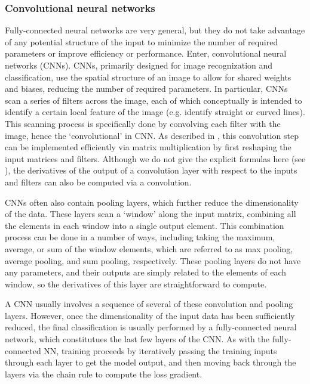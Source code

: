\subsubsection{Convolutional neural networks}
Fully-connected neural networks are very general, but they do not take advantage of any potential structure of the input to minimize the number of required parameters or improve efficiency or performance.
Enter, convolutional neural networks (CNNs).
CNNs, primarily designed for image recognization and classification, use the spatial structure of an image to allow for shared weights and biases, reducing the number of required parameters.
In particular, CNNs scan a series of filters across the image, each of which conceptually is intended to identify a certain local feature of the image (e.g. identify straight or curved lines).
This scanning process is specifically done by convolving each filter with the image, hence the `convolutional' in CNN.
As described in \textcolor{blue}{\autocite{Making_faster}}, this convolution step can be implemented efficiently via matrix multiplication by first reshaping the input matrices and filters.
Although we do not give the explicit formulas here (see \textcolor{blue}{\autocite{Solai_2018}}), the derivatives of the output of a convolution layer with respect to the inputs and filters can also be computed via a convolution.

CNNs often also contain pooling layers, which further reduce the dimensionality of the data.
These layers scan a `window' along the input matrix, combining all the elements in each window into a single output element.
This combination process can be done in a number of ways, including taking the maximum, average, or sum of the window elements, which are referred to as max pooling, average pooling, and sum pooling, respectively.
These pooling layers do not have any parameters, and their outputs are simply related to the elements of each window, so the derivatives of this layer are straightforward to compute.

A CNN usually involves a sequence of several of these convolution and pooling layers.
However, once the dimensionality of the input data has been sufficiently reduced, the final classification is usually performed by a fully-connected neural network, which constitutues the last few layers of the CNN.
As with the fully-connected NN, training proceeds by iteratively passing the training inputs through each layer to get the model output, and then moving back through the layers via the chain rule to compute the loss gradient.

